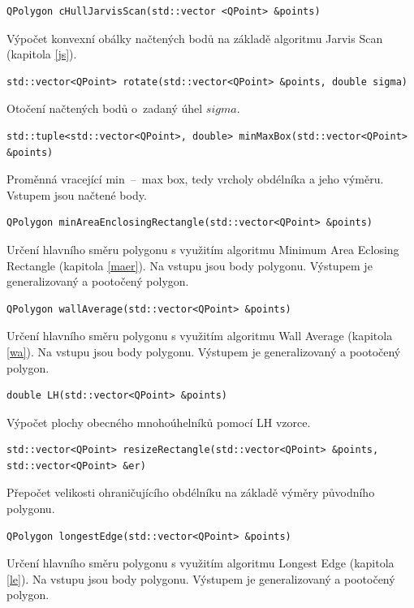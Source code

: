 \documentclass[a4paper, 12pt, oneside, titlepage]{article} %
\begin{document}
\begin{verbatim}
QPolygon cHullJarvisScan(std::vector <QPoint> &points)
\end{verbatim}
Výpočet konvexní obálky načtených bodů na základě algoritmu Jarvis Scan (kapitola \ref{js}).\\

\begin{verbatim}
std::vector<QPoint> rotate(std::vector<QPoint> &points, double sigma)
\end{verbatim}
Otočení načtených bodů o~zadaný úhel $sigma$.\\

\begin{verbatim}
std::tuple<std::vector<QPoint>, double> minMaxBox(std::vector<QPoint> &points)
\end{verbatim}
Proměnná vracející min~--~max box, tedy vrcholy obdélníka a jeho výměru. Vstupem jsou načtené body.\\

\begin{verbatim}
QPolygon minAreaEnclosingRectangle(std::vector<QPoint> &points)
\end{verbatim}
Určení hlavního směru polygonu s využitím algoritmu Minimum Area Eclosing Rectangle (kapitola \ref{maer}). Na vstupu jsou body polygonu. Výstupem je generalizovaný a pootočený polygon.\\

\begin{verbatim}
QPolygon wallAverage(std::vector<QPoint> &points)
\end{verbatim}
Určení hlavního směru polygonu s využitím algoritmu Wall Average (kapitola \ref{wa}). Na vstupu jsou body polygonu. Výstupem je generalizovaný a pootočený polygon.\\

\begin{verbatim}
double LH(std::vector<QPoint> &points)
\end{verbatim}
Výpočet plochy obecného mnohoúhelníků pomocí LH vzorce.\\ 

\begin{verbatim}
std::vector<QPoint> resizeRectangle(std::vector<QPoint> &points, std::vector<QPoint> &er)
\end{verbatim}
Přepočet velikosti ohraničujícího obdélníku na základě výměry původního polygonu.\\

\begin{verbatim}
QPolygon longestEdge(std::vector<QPoint> &points)
\end{verbatim}
Určení hlavního směru polygonu s využitím algoritmu Longest Edge (kapitola \ref{le}). Na vstupu jsou body polygonu. Výstupem je generalizovaný a pootočený polygon.\\
\end{document}

